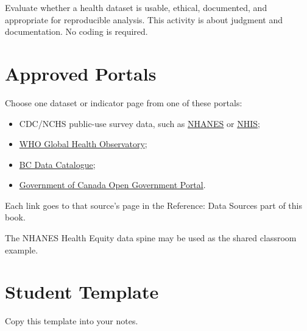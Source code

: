 \documentclass[
  letterpaper,
  DIV=11,
  numbers=noendperiod,
  oneside]{scrreprt}
\providecommand{\tightlist}{%
  \setlength{\itemsep}{0pt}\setlength{\parskip}{0pt}}
\begin{document}
Evaluate whether a health dataset is usable, ethical, documented, and
appropriate for reproducible analysis. This activity is about judgment
and documentation. No coding is required.

\section*{Approved Portals}\label{approved-portals}


Choose one dataset or indicator page from one of these portals:

\begin{itemize}
\tightlist
\item
  CDC/NCHS public-use survey data, such as
  \href{../../references/data-sources/nhanes.qmd}{NHANES} or
  \href{../../references/data-sources/nhis.qmd}{NHIS};
\item
  \href{../../references/data-sources/gho.qmd}{WHO Global Health
  Observatory};
\item
  \href{../../references/data-sources/bc-data-catalogue.qmd}{BC Data
  Catalogue};
\item
  \href{../../references/data-sources/open-portal.qmd}{Government of
  Canada Open Government Portal}.
\end{itemize}

Each link goes to that source's page in the Reference: Data Sources part
of this book.

The NHANES Health Equity data spine may be used as the shared classroom
example.

\section*{Student Template}\label{student-template}


Copy this template into your notes.
\end{document}
